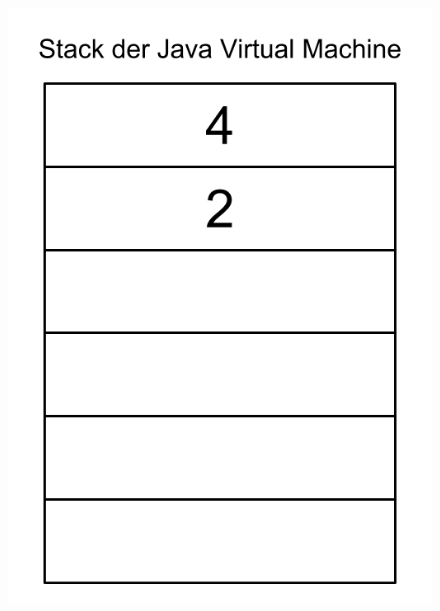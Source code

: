 \begin{figure}[htb]
\begin{center}
{	\includegraphics[scale=0.2]{pics/stack_visual(2).png}
}\quad 
{}
\end{center}
\end{figure}
